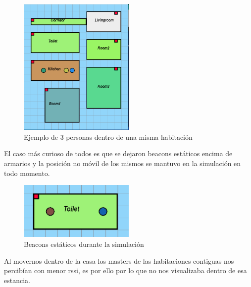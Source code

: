 \documentclass[a4paper ,12pt, onecolumn]{article}
\begin{document}
            \begin{center}
                \begin{figure}[]
                    \centering
                    \includegraphics[width=0.5\textwidth]{../../Memmory/images/house_simulation_1.PNG}
                    \caption{Ejemplo de 3 personas dentro de una misma habitación}
                    \label{fig:mesh11}
                \end{figure}
            \end{center}          
            El caso más curioso de todos es que se dejaron beacons estáticos encima de armarios y la posición no móvil de los mismos 
            se mantuvo en la simulación en todo momento.
            \begin{center}
                \begin{figure}[]
                    \centering
                    \includegraphics[width=0.5\textwidth]{../../Memmory/images/house_simulation_2.PNG}
                    \caption{Beacons estáticos durante la simulación}
                    \label{fig:mesh11}
                \end{figure}
            \end{center} 
            Al movernos dentro de la casa los masters de las habitaciones contiguas nos percibían con menor rssi, es por
            ello por lo que no nos visualizaba dentro de esa estancia.
\end{document}

